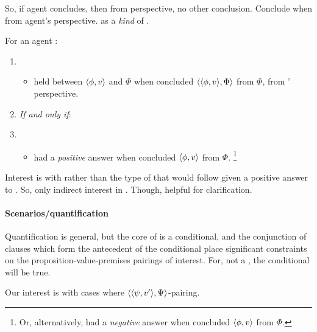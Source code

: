 \begin{note}
  So, if agent concludes, then from perspective, no other conclusion.
  Conclude when \support{} from agent's perspective.
  \zSN{} as a \emph{kind} of \support{}.

  \begin{definition}[\izS{}]
    \label{idea:zS}
    For an agent \vAgent{}:
    \begin{enumerate}[label=]
    \item
      \begin{itemize}
      \item
        \zS{} held between \(\langle \phi, v \rangle\) and \(\Phi\) when \vAgent{} concluded \(\langle \langle \phi, v \rangle, \Phi \rangle\) from \(\Phi\), from \vAgent{}' perspective.
      \end{itemize}
    \item \emph{If and only if}:
    \item
      \begin{itemize}[]
      \item
        \qzS{} had a \emph{positive} answer when \vAgent{} concluded \(\langle \phi, v \rangle\) from \(\Phi\).%
        \footnote{
          Or, alternatively, \nqzS{} had a \emph{negative} answer when \vAgent{} concluded \(\langle \phi, v \rangle\) from \(\Phi\).
        }
      \end{itemize}
    \end{enumerate}
    \vspace{-\baselineskip}
  \end{definition}

  Interest is with \qzS{} rather than the type of \support{} that would follow given a positive answer to \qzS{}.
  So, only indirect interest in \izS{}.
  Though, helpful for clarification.
\end{note}

\paragraph{Scenarios/quantification}

\begin{note}
  Quantification is general, but the core of \qzS{} is a conditional, and the conjunction of clauses which form the antecedent of the conditional place significant constraints on the proposition-value-premises pairings of interest.
  For, { \color{blue} not a \requ{} }, the conditional will be true.

  Our interest is with cases where { \color{blue} \requ{} } \(\langle \langle \psi, v' \rangle, \Psi \rangle\)-pairing.
\end{note}


